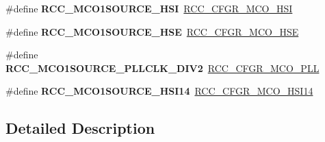 \begin{DoxyCompactItemize}
\#define {\bfseries R\+C\+C\+\_\+\+M\+C\+O1\+S\+O\+U\+R\+C\+E\+\_\+\+H\+SI}~\hyperlink{group___peripheral___registers___bits___definition_ga91f0ac507b8c4e5d443c107d934cfdb1}{R\+C\+C\+\_\+\+C\+F\+G\+R\+\_\+\+M\+C\+O\+\_\+\+H\+SI}
\item 
\mbox{\label{group___r_c_c___m_c_o___clock___source_ga5582d2ab152eb440a6cc3ae4833b043f}} 
\#define {\bfseries R\+C\+C\+\_\+\+M\+C\+O1\+S\+O\+U\+R\+C\+E\+\_\+\+H\+SE}~\hyperlink{group___peripheral___registers___bits___definition_ga183179f1b1763f38ae88f2d8d90acd70}{R\+C\+C\+\_\+\+C\+F\+G\+R\+\_\+\+M\+C\+O\+\_\+\+H\+SE}
\item 
\mbox{\label{group___r_c_c___m_c_o___clock___source_ga5bf5e242943168d45ace0c547077e321}} 
\#define {\bfseries R\+C\+C\+\_\+\+M\+C\+O1\+S\+O\+U\+R\+C\+E\+\_\+\+P\+L\+L\+C\+L\+K\+\_\+\+D\+I\+V2}~\hyperlink{group___peripheral___registers___bits___definition_gac1b83ae21df9327e2a705b19ce981da6}{R\+C\+C\+\_\+\+C\+F\+G\+R\+\_\+\+M\+C\+O\+\_\+\+P\+LL}
\item 
\mbox{\label{group___r_c_c___m_c_o___clock___source_gadbff3bcd8c7b213280f8078a6564d9fa}} 
\#define {\bfseries R\+C\+C\+\_\+\+M\+C\+O1\+S\+O\+U\+R\+C\+E\+\_\+\+H\+S\+I14}~\hyperlink{group___peripheral___registers___bits___definition_ga09a53ff21eba16600568a228a7a9646a}{R\+C\+C\+\_\+\+C\+F\+G\+R\+\_\+\+M\+C\+O\+\_\+\+H\+S\+I14}
\end{DoxyCompactItemize}


\subsection{Detailed Description}
